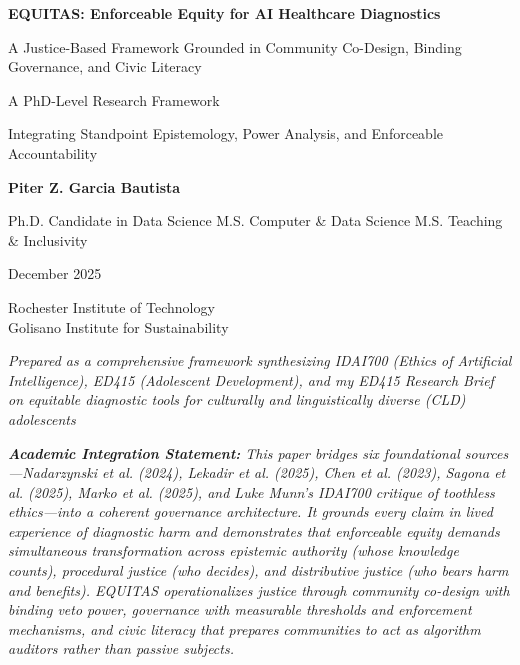 \documentclass[12pt,a4paper]{article}
\begin{document}
\begin{titlepage}
\centering
\vspace*{2.5cm}

{\Large \textbf{EQUITAS: Enforceable Equity for AI Healthcare Diagnostics}}

\vspace{0.6cm}

{\large A Justice-Based Framework Grounded in Community Co-Design, Binding Governance, and Civic Literacy}

\vspace{1.6cm}

{\normalsize A PhD-Level Research Framework}

\vspace{1.6cm}

{\normalsize Integrating Standpoint Epistemology, Power Analysis, and Enforceable Accountability}

\vspace{2.4cm}

{\large \textbf{Piter Z. Garcia Bautista} \par}
{\large Ph.D. Candidate in Data Science \textbullet{} M.S. Computer \& Data Science \textbullet{} M.S. Teaching \& Inclusivity}

\vspace{0.3cm}

{\normalsize December 2025}

\vspace{2.5cm}

{\small Rochester Institute of Technology \\ Golisano Institute for Sustainability}

\vfill

{
\footnotesize \textit{Prepared as a comprehensive framework synthesizing IDAI700 (Ethics of Artificial Intelligence), ED415 (Adolescent Development), and my ED415 Research Brief on equitable diagnostic tools for culturally and linguistically diverse (CLD) adolescents} \\

\vspace{0.3cm}

\textit{\tiny\textbf{Academic Integration Statement:} This paper bridges six foundational sources---Nadarzynski et al. (2024), Lekadir et al. (2025), Chen et al. (2023), Sagona et al. (2025), Marko et al. (2025), and Luke Munn's IDAI700 critique of toothless ethics---into a coherent governance architecture. It grounds every claim in lived experience of diagnostic harm and demonstrates that enforceable equity demands simultaneous transformation across epistemic authority (whose knowledge counts), procedural justice (who decides), and distributive justice (who bears harm and benefits). EQUITAS operationalizes justice through community co-design with binding veto power, governance with measurable thresholds and enforcement mechanisms, and civic literacy that prepares communities to act as algorithm auditors rather than passive subjects.}
}

\end{titlepage}
\end{document}
